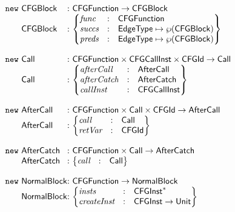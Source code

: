 \[
\begin{array}{@{~}r@{~}l@{}l@{~}l}
\new & \CFGBlock & : & \CFGFunction \rightarrow \CFGBlock \\
& \CFGBlock & : &
\begin{Bmatrix*}[l]
\emph{func} & : & \CFGFunction \\
\emph{succs} & : & \EdgeType \mapsto \powerset{\CFGBlock} \\
\emph{preds} & : & \EdgeType \mapsto \powerset{\CFGBlock} \\
\end{Bmatrix*}\\
&&&\\

\new & \Call & : & \CFGFunction \times \CFGCallInst \times \CFGId \rightarrow \Call \\
& \Call & : &
\begin{Bmatrix*}[l]
\emph{afterCall} & : & \AfterCall\\
\emph{afterCatch} & : & \AfterCatch\\
\emph{callInst} & : & \CFGCallInst\\
\end{Bmatrix*}\\
&&&\\

\new & \AfterCall & : & \CFGFunction \times \Call \times \CFGId \rightarrow \AfterCall \\
& \AfterCall & : &
\begin{Bmatrix*}[l]
\emph{call} & : & \Call \\
\emph{retVar} & : & \CFGId \\
\end{Bmatrix*}\\
&&&\\

\new & \AfterCatch & : & \CFGFunction \times \Call \rightarrow \AfterCatch \\
& \AfterCatch & : &
\begin{Bmatrix*}[l]
\emph{call} & : & \Call \\
\end{Bmatrix*}\\
&&&\\

\new & \NormalBlock & : & \CFGFunction \rightarrow \NormalBlock\\
& \NormalBlock & : &
\begin{Bmatrix*}[l]
\emph{insts} & : & \CFGInst^{*} \\
\emph{createInst} & : & \CFGInst \rightarrow \Unit \\
\end{Bmatrix*}\\
&&&\\


\end{array}\]
